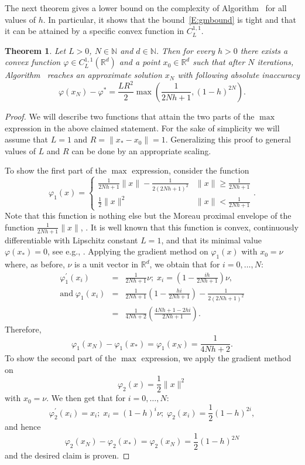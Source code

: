 \documentclass[12pt]{article}
\numberwithin{equation}{section}
\newtheorem{theorem}{Theorem}[section]
\theoremstyle{definition}
\theoremstyle{remark}
\newcommand{\gradalg}{\text{GM}\xspace}
\begin{document}
The next theorem gives a lower bound on the complexity of Algorithm~\gradalg for all values of
$h$. In particular, it shows that the bound~\eqref{E:gmbound} is tight and that it can be
attained by a specific convex function in $C^{1,1}_L$.
\begin{theorem}\label{T:gradLowBound}
Let $L>0$, $N\in \mathbb{N}$ and $d\in \mathbb{N}$. Then for every $h>0$ there exists a convex
function $\varphi \in C^{1,1}_L(\mathbb{R}^d)$ and a point $x_0 \in \mathbb{R}^d$ such that
after $N$ iterations, Algorithm~\gradalg
reaches an approximate solution $x_N$ with following absolute inaccuracy
\[
    \varphi(x_N)-\varphi^\ast = \frac{L R^2}{2}
    \max \left( \frac{1}{2 N h+1},(1-h)^{2N}\right).
\]
\end{theorem}
\begin{proof}
We will describe two functions that attain the two parts of the $\max$ expression in the above
claimed statement. For the sake of simplicity we will
assume that %
$L=1$ and $R=\|x_\ast-x_0\|=1$.
Generalizing this proof to general values of $L$ and $R$
can be done by an appropriate scaling.

To show the first part of the $\max$ expression, consider the function
\[
    \varphi_1(x) =
    \begin{cases}
        \frac{1}{2Nh+1} \|x\| -\frac{1}{2(2Nh+1)^2}       &   \| x \| \geq \frac{1}{2Nh+1} \\
        \frac{1}{2} \|x\|^2         &   \| x\| < \frac{1}{2Nh+1}
    \end{cases}.
\]
Note that this function is nothing else but the Moreau proximal envelope of the function
$\frac{1}{2Nh+1}\|x\|$, \cite{M65}. It is well known that this function is convex, continuously
differentiable with Lipschitz constant $L=1$, and that its minimal value $\varphi(x_*)=0$, see
e.g., \cite{M65, rock-wets-book98}. Applying the gradient method on $\varphi_1(x)$ with
$x_0=\nu$ where, as before, $\nu$ is a unit vector in $\mathbb{R}^d$, we obtain that for $i=0,\dots,N$:
\begin{eqnarray*}
  \varphi_1^\prime(x_i) &=& \frac{1}{2N h+1}\nu;\;  x_i = \left(1-\frac{i h}{2N h+1}\right)\nu,\\
 \mbox{and}\; \varphi_1(x_i) &=&  \frac{1}{2N h+1}\left(1-\frac{h i}{2N h+1} \right)-\frac{1}{2(2N h+1)^2}\\
 &=& \frac{1}{4Nh+2} \left(\frac{4Nh+1-2hi}{2Nh+1}\right).
 \end{eqnarray*}
Therefore,
\[
    \varphi_1(x_N)-\varphi_1(x_\ast)  = \varphi_1(x_N) = \frac{1}{4 N h+2}.
\]
To show the second part of the $\max$ expression, we apply the gradient method on
\[
    \varphi_2(x) = \frac{1}{2} \|x\|^2
\]
with $x_0=\nu$. We then get that for $i=0,\dots,N$:
$$
    \varphi_2^\prime(x_i)= x_i;\;  x_i =(1-h)^i \nu;\; \varphi_2(x_i) = \frac{1}{2}(1-h)^{2i},
$$
and hence
\[
    \varphi_2(x_N)-\varphi_2(x_\ast) = \varphi_2(x_N) = \frac{1}{2} (1-h)^{2N}
\]
and the desired claim is proven.
\end{proof}
\end{document}
